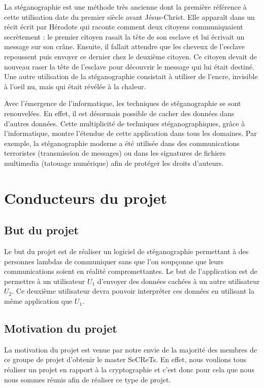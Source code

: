 \documentclass[11pt]{article}
\begin{document}
La stéganographie est une méthode très ancienne dont la première référence à
cette utilisation date du premier siècle avant Jésus-Christ. Elle apparaît dans
un récit écrit par Hérodote qui raconte comment deux citoyens communiquaient
secrètement : le premier citoyen rasait la tête de son esclave et lui écrivait
un message sur son crâne. Ensuite, il fallait attendre que les cheveux de
l'esclave repoussent puis envoyer ce dernier chez le deuxième citoyen. Ce
citoyen devait de nouveau raser la tête de l'esclave pour découvrir le message
qui lui était destiné. Une autre utilisation de la stéganographie consistait à
utiliser de l'encre, invisible à l'oeil nu, mais qui était révélée à la chaleur.

Avec l'émergence de l'informatique, les techniques de stéganographie se sont
renouvelées. En effet, il est désormais possible de cacher des données dans
d'autres données. Cette multiplicité de techniques stéganographiques, grâce à
l'informatique, montre l'étendue de cette application dans tous les domaines.
Par exemple, la stéganographie moderne a été utilisée dans des communications
terroristes (transmission de messages) ou dans les signatures de fichiers
multimedia (tatouage numérique) afin de protéger les droits d'auteurs. 

\section{Conducteurs du projet}

\subsection{But du projet}

Le but du projet est de réaliser un logiciel de stéganographie permettant à des
personnes lambdas de communiquer sans que l'on soupçonne que leurs
communications soient en réalité compromettantes. Le but de l'application est
de permettre à un utilisateur $U_1$ d'envoyer des données cachées à un autre
utilisateur $U_2$. Ce deuxième utilisateur devra pouvoir interpréter ces données
en utilisant la même application que $U_1$. 

\subsection{Motivation du projet}

La motivation du projet est venue par notre envie de la majorité des membres de
ce groupe de projet d'obtenir le master SeCReTs. En effet, nous voulions tous
réaliser un projet en rapport à la cryptographie et c'est donc pour cela que
nous nous sommes réunis afin de réaliser ce type de projet. 
\end{document}
